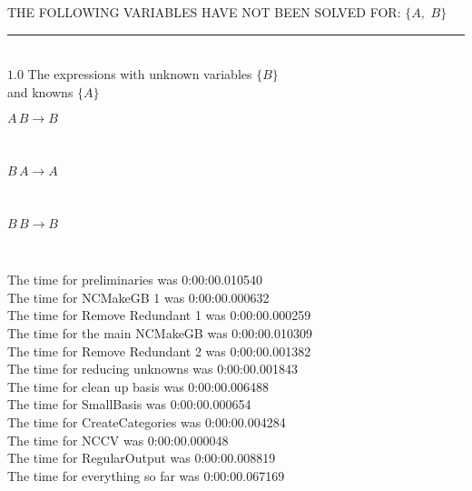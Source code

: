 \documentclass[rep10,leqno]{report}
\begin{document}
THE FOLLOWING VARIABLES HAVE NOT BEEN SOLVED FOR:\hfil\break
$\{A,
$ $
B\}$
\smallskip\\
\rule[3pt]{6in}{.7pt}\\
$1.0$  The expressions with unknown variables $\{B\}$\\
and knowns $\{A\}$\smallskip\\
\begin{minipage}{6in}
$
A\,
 B\rightarrow B
$
\end{minipage}\medskip \\
\begin{minipage}{6in}
$
B\,
 A\rightarrow A
$
\end{minipage}\medskip \\
\begin{minipage}{6in}
$
B\,
 B\rightarrow B
$
\end{minipage}\\
\vspace{10pt}

\noindent
The time for preliminaries was 0:00:00.010540\\
The time for NCMakeGB 1 was 0:00:00.000632\\
The time for Remove Redundant 1 was 0:00:00.000259\\
The time for the main NCMakeGB was 0:00:00.010309\\
The time for Remove Redundant 2 was 0:00:00.001382\\
The time for reducing unknowns was 0:00:00.001843\\
The time for clean up basis was 0:00:00.006488\\
The time for SmallBasis was 0:00:00.000654\\
The time for CreateCategories was 0:00:00.004284\\
The time for NCCV was 0:00:00.000048\\
The time for RegularOutput was 0:00:00.008819\\
The time for everything so far was 0:00:00.067169\\
\end{document}

